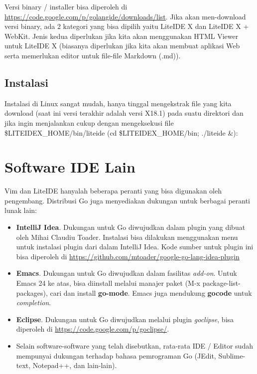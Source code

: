 Versi binary / installer bisa diperoleh di \url{https://code.google.com/p/golangide/downloads/list}. Jika akan men-download versi binary, ada 2 kategori yang bisa dipilih yaitu LiteIDE X dan LiteIDE X + WebKit. Jenis kedua diperlukan jika kita akan menggunakan HTML Viewer untuk LiteIDE X (biasanya diperlukan jika kita akan membuat aplikasi Web serta memerlukan editor untuk file-file Markdown (.md)).

\subsection{Instalasi}

Instalasi di Linux sangat mudah, hanya tinggal mengekstrak file yang kita download (saat ini versi terakhir adalah versi X18.1) pada suatu direktori dan jika ingin menjalankan cukup dengan mengeksekusi file \$LITEIDEX_HOME/bin/liteide (cd \$LITEIDEX_HOME/bin; ./liteide \&):

\section{Software IDE Lain}

Vim dan LiteIDE hanyalah beberapa peranti yang bisa digunakan oleh pengembang. Distribusi Go juga menyediakan dukungan untuk berbagai peranti lunak lain:
\begin{itemize}
  \item \textbf{IntelliJ Idea}. Dukungan untuk Go diwujudkan dalam plugin yang dibuat oleh Mihai Claudiu Toader. Instalasi bisa dilakukan menggunakan menu untuk instalasi plugin dari dalam IntelliJ Idea. Kode sumber untuk plugin ini bisa diperoleh di \url{https://github.com/mtoader/google-go-lang-idea-plugin}
  \item \textbf{Emacs}. Dukungan untuk Go diwujudkan dalam fasilitas \textit{add-on}. Untuk Emacs 24 ke atas, bisa diinstall melalui manajer paket (M-x package-list-packages), cari dan install \textbf{go-mode}. Emacs juga mendukung \textbf{gocode} untuk \textit{completion}.
  \item \textbf{Eclipse}. Dukungan untuk Go diwujudkan melalui plugin \textit{goclipse}, bisa diperoleh di \url{https://code.google.com/p/goclipse/}.
  \item Selain software-software yang telah disebutkan, rata-rata IDE / Editor sudah mempunyai dukungan terhadap bahasa pemrograman Go (JEdit, Sublime-text, Notepad++, dan lain-lain).
\end{itemize}
